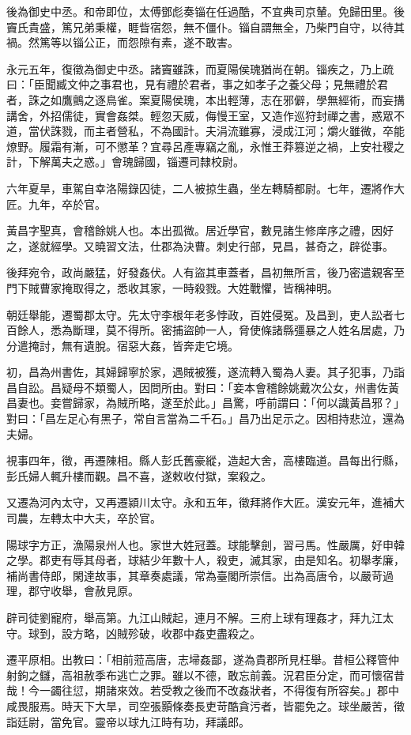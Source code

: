 \begin{pinyinscope}
後為御史中丞。和帝即位，太傅鄧彪奏锱在任過酷，不宜典司京輦。免歸田里。後竇氏貴盛，篤兄弟秉權，睚眥宿怨，無不僵仆。锱自謂無全，乃柴門自守，以待其禍。然篤等以锱公正，而怨隙有素，遂不敢害。

永元五年，復徵為御史中丞。諸竇雖誅，而夏陽侯瑰猶尚在朝。锱疾之，乃上疏曰：「臣聞臧文仲之事君也，見有禮於君者，事之如孝子之養父母；見無禮於君者，誅之如鷹鸇之逐鳥雀。案夏陽侯瑰，本出輕薄，志在邪僻，學無經術，而妄搆講舍，外招儒徒，實會姦桀。輕忽天威，侮慢王室，又造作巡狩封禪之書，惑眾不道，當伏誅戮，而主者營私，不為國計。夫涓流雖寡，浸成江河；爝火雖微，卒能燎野。履霜有漸，可不懲革？宜尋呂產專竊之亂，永惟王莽篡逆之禍，上安社稷之計，下解萬夫之惑。」會瑰歸國，锱遷司隸校尉。

六年夏旱，車駕自幸洛陽錄囚徒，二人被掠生蟲，坐左轉騎都尉。七年，遷將作大匠。九年，卒於官。

黃昌字聖真，會稽餘姚人也。本出孤微。居近學官，數見諸生修庠序之禮，因好之，遂就經學。又曉習文法，仕郡為決曹。刺史行部，見昌，甚奇之，辟從事。

後拜宛令，政尚嚴猛，好發姦伏。人有盜其車蓋者，昌初無所言，後乃密遣親客至門下賊曹家掩取得之，悉收其家，一時殺戮。大姓戰懼，皆稱神明。

朝廷舉能，遷蜀郡太守。先太守李根年老多悖政，百姓侵冤。及昌到，吏人訟者七百餘人，悉為斷理，莫不得所。密捕盜帥一人，脅使條諸縣彊暴之人姓名居處，乃分遣掩討，無有遺脫。宿惡大姦，皆奔走它境。

初，昌為州書佐，其婦歸寧於家，遇賊被獲，遂流轉入蜀為人妻。其子犯事，乃詣昌自訟。昌疑母不類蜀人，因問所由。對曰：「妾本會稽餘姚戴次公女，州書佐黃昌妻也。妾嘗歸家，為賊所略，遂至於此。」昌驚，呼前謂曰：「何以識黃昌邪？」對曰：「昌左足心有黑子，常自言當為二千石。」昌乃出足示之。因相持悲泣，還為夫婦。

視事四年，徵，再遷陳相。縣人彭氏舊豪縱，造起大舍，高樓臨道。昌每出行縣，彭氏婦人輒升樓而觀。昌不喜，遂敕收付獄，案殺之。

又遷為河內太守，又再遷潁川太守。永和五年，徵拜將作大匠。漢安元年，進補大司農，左轉太中大夫，卒於官。

陽球字方正，漁陽泉州人也。家世大姓冠蓋。球能擊劍，習弓馬。性嚴厲，好申韓之學。郡吏有辱其母者，球結少年數十人，殺吏，滅其家，由是知名。初舉孝廉，補尚書侍郎，閑達故事，其章奏處議，常為臺閣所崇信。出為高唐令，以嚴苛過理，郡守收舉，會赦見原。

辟司徒劉寵府，舉高第。九江山賊起，連月不解。三府上球有理姦才，拜九江太守。球到，設方略，凶賊殄破，收郡中姦吏盡殺之。

遷平原相。出教曰：「相前蒞高唐，志埽姦鄙，遂為貴郡所見枉舉。昔桓公釋管仲射鉤之讎，高祖赦季布逃亡之罪。雖以不德，敢忘前義。況君臣分定，而可懷宿昔哉！今一蠲往愆，期諸來效。若受教之後而不改姦狀者，不得復有所容矣。」郡中咸畏服焉。時天下大旱，司空張顥條奏長吏苛酷貪污者，皆罷免之。球坐嚴苦，徵詣廷尉，當免官。靈帝以球九江時有功，拜議郎。


\end{pinyinscope}
